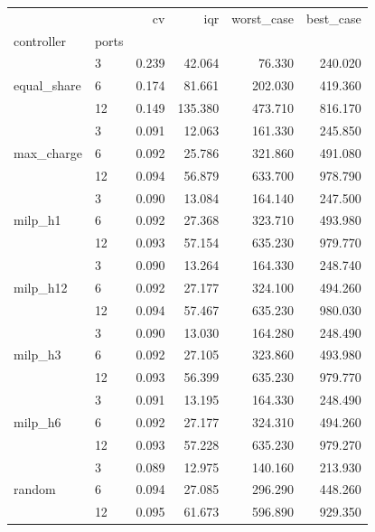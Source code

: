 \begin{tabular}{llrrrr}
\toprule
 &  & cv & iqr & worst_case & best_case \\
controller & ports &  &  &  &  \\
\midrule
\multirow[t]{3}{*}{equal_share} & 3 & 0.239 & 42.064 & 76.330 & 240.020 \\
 & 6 & 0.174 & 81.661 & 202.030 & 419.360 \\
 & 12 & 0.149 & 135.380 & 473.710 & 816.170 \\
\cline{1-6}
\multirow[t]{3}{*}{max_charge} & 3 & 0.091 & 12.063 & 161.330 & 245.850 \\
 & 6 & 0.092 & 25.786 & 321.860 & 491.080 \\
 & 12 & 0.094 & 56.879 & 633.700 & 978.790 \\
\cline{1-6}
\multirow[t]{3}{*}{milp_h1} & 3 & 0.090 & 13.084 & 164.140 & 247.500 \\
 & 6 & 0.092 & 27.368 & 323.710 & 493.980 \\
 & 12 & 0.093 & 57.154 & 635.230 & 979.770 \\
\cline{1-6}
\multirow[t]{3}{*}{milp_h12} & 3 & 0.090 & 13.264 & 164.330 & 248.740 \\
 & 6 & 0.092 & 27.177 & 324.100 & 494.260 \\
 & 12 & 0.094 & 57.467 & 635.230 & 980.030 \\
\cline{1-6}
\multirow[t]{3}{*}{milp_h3} & 3 & 0.090 & 13.030 & 164.280 & 248.490 \\
 & 6 & 0.092 & 27.105 & 323.860 & 493.980 \\
 & 12 & 0.093 & 56.399 & 635.230 & 979.770 \\
\cline{1-6}
\multirow[t]{3}{*}{milp_h6} & 3 & 0.091 & 13.195 & 164.330 & 248.490 \\
 & 6 & 0.092 & 27.177 & 324.310 & 494.260 \\
 & 12 & 0.093 & 57.228 & 635.230 & 979.270 \\
\cline{1-6}
\multirow[t]{3}{*}{random} & 3 & 0.089 & 12.975 & 140.160 & 213.930 \\
 & 6 & 0.094 & 27.085 & 296.290 & 448.260 \\
 & 12 & 0.095 & 61.673 & 596.890 & 929.350 \\
\cline{1-6}
\bottomrule
\end{tabular}
